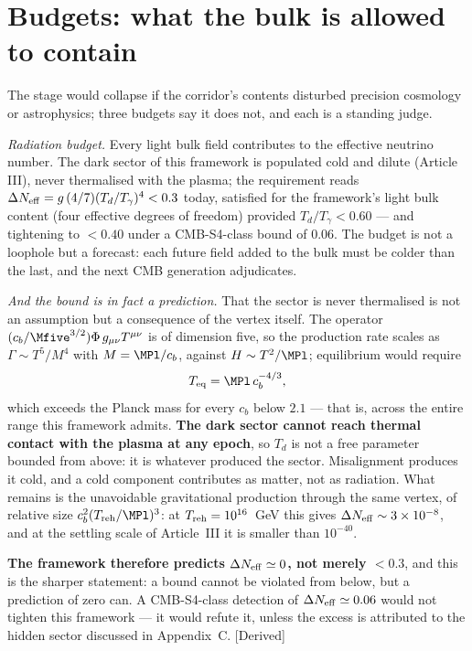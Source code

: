 \section{Budgets: what the bulk is allowed to contain}
The stage would collapse if the corridor's contents disturbed precision cosmology or astrophysics; three budgets say it does not, and each is a standing judge.

\emph{Radiation budget.} Every light bulk field contributes to the effective neutrino number. The dark sector of this framework is populated cold and dilute (Article III), never thermalised with the plasma; the requirement reads $\Delta N_{\rm eff}=g\,(4/7)(T_{d}/T_{\gamma})^{4}<0.3$ today, satisfied for the framework's light bulk content (four effective degrees of freedom) provided $T_{d}/T_{\gamma}<0.60$ --- and tightening to $<0.40$ under a CMB-S4-class bound of $0.06$. The budget is not a loophole but a forecast: each future field added to the bulk must be colder than the last, and the next CMB generation adjudicates.

\emph{And the bound is in fact a prediction.} That the sector is never thermalised is not an assumption but a consequence of the vertex itself. The operator $(c_{b}/\Mfive^{3/2})\Phi\,g_{\mu\nu}T^{\mu\nu}$ is of dimension five, so the production rate scales as $\Gamma\sim T^{5}/M^{4}$ with $M=\MPl/c_{b}$, against $H\sim T^{2}/\MPl$; equilibrium would require
\begin{equation}
T_{\rm eq}=\MPl\,c_{b}^{-4/3},
\end{equation}
which exceeds the Planck mass for every $c_{b}$ below $2.1$ --- that is, across the entire range this framework admits. \textbf{The dark sector cannot reach thermal contact with the plasma at any epoch}, so $T_{d}$ is not a free parameter bounded from above: it is whatever produced the sector. Misalignment produces it cold, and a cold component contributes as matter, not as radiation. What remains is the unavoidable gravitational production through the same vertex, of relative size $c_{b}^{2}(T_{\rm reh}/\MPl)^{3}$: at $T_{\rm reh}=10^{16}$~GeV this gives $\Delta N_{\rm eff}\sim3\times10^{-8}$, and at the settling scale of Article~III it is smaller than $10^{-40}$.

\textbf{The framework therefore predicts $\Delta N_{\rm eff}\simeq0$, not merely $<0.3$}, and this is the sharper statement: a bound cannot be violated from below, but a prediction of zero can. A CMB-S4-class detection of $\Delta N_{\rm eff}\simeq0.06$ would not tighten this framework --- it would refute it, unless the excess is attributed to the hidden sector discussed in Appendix~C. [Derived]

